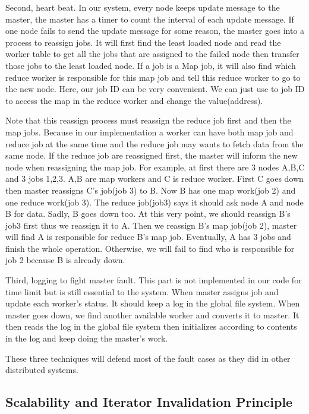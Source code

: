 \documentclass[12pt]{article}
\begin{document}
Second, heart beat. In our system, every node keeps update message to the master, the master has a timer to count the interval of each update message. If one node fails to send the update message for some reason, the master goes into a process to reassign jobs. It will first find the least loaded node and read the worker table to get all the jobs that are assigned to the failed node then transfer those jobs to the least loaded node. If a job is a Map job, it will also find which reduce worker is responsible for this map job and tell this reduce worker to go to the new node. Here, our job ID can be very convenient. We can just use to job ID to access the map in the reduce worker and change the value(address).
 
Note that this reassign process must reassign the reduce job first and then the map jobs. Because in our implementation a worker can have both map job and reduce job at the same time and the reduce job may wants to fetch data from the same node. If the reduce job are reassigned first, the master will inform the new node when reassigning the map job. For example, at first there are 3 nodes A,B,C and 3 jobs 1,2,3. A,B are map workers and C is reduce worker. First C goes down then master reassigns C's job(job 3) to B. Now B has one map work(job 2) and one reduce work(job 3). The reduce job(job3) says it should ask node A and node B for data. Sadly, B goes down too. At this very point, we should reassign B's job3 first thus we reassign it to A. Then we reassign B's map job(job 2), master will find A is responsible for reduce B's map job. Eventually, A has 3 jobs and finish the whole operation. Otherwise, we will fail to find who is responsible for job 2 because B is already down.

Third, logging to fight master fault. This part is not implemented in our code for time limit but is still essential to the system. When master assigns job and update each worker's status. It should keep a log in the global file system. When master goes down, we find another available worker and converts it to master. It then reads the log in the global file system then initializes according to contents in the log and keep doing the master's work.

These three techniques will defend most of the fault cases as they did in other distributed systems.
   
\subsection{Scalability and Iterator Invalidation Principle}
\end{document}
